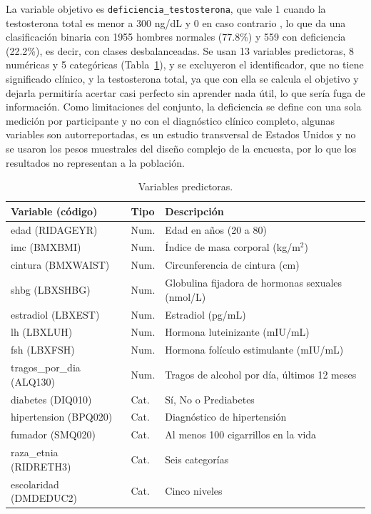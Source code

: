 \documentclass[conference]{IEEEtran}
\begin{document}
La variable objetivo es \texttt{deficiencia\_testosterona}, que vale 1 cuando la testosterona total es menor a 300 ng/dL y 0 en caso contrario \cite{mulhall2018}, lo que da una clasificación binaria con 1955 hombres normales (77.8\%) y 559 con deficiencia (22.2\%), es decir, con clases desbalanceadas. Se usan 13 variables predictoras, 8 numéricas y 5 categóricas (Tabla~\ref{tab:variables}), y se excluyeron el identificador, que no tiene significado clínico, y la testosterona total, ya que con ella se calcula el objetivo y dejarla permitiría acertar casi perfecto sin aprender nada útil, lo que sería fuga de información. Como limitaciones del conjunto, la deficiencia se define con una sola medición por participante y no con el diagnóstico clínico completo, algunas variables son autorreportadas, es un estudio transversal de Estados Unidos y no se usaron los pesos muestrales del diseño complejo de la encuesta, por lo que los resultados no representan a la población.

\begin{table}[t]
\centering
\footnotesize
\caption{Variables predictoras.}
\label{tab:variables}
\begin{tabular}{l l p{4.6cm}}
\toprule
Variable (código) & Tipo & Descripción \\
\midrule
edad (RIDAGEYR) & Num. & Edad en años (20 a 80) \\
imc (BMXBMI) & Num. & Índice de masa corporal (kg/m$^2$) \\
cintura (BMXWAIST) & Num. & Circunferencia de cintura (cm) \\
shbg (LBXSHBG) & Num. & Globulina fijadora de hormonas sexuales (nmol/L) \\
estradiol (LBXEST) & Num. & Estradiol (pg/mL) \\
lh (LBXLUH) & Num. & Hormona luteinizante (mIU/mL) \\
fsh (LBXFSH) & Num. & Hormona folículo estimulante (mIU/mL) \\
tragos\_por\_dia (ALQ130) & Num. & Tragos de alcohol por día, últimos 12 meses \\
diabetes (DIQ010) & Cat. & Sí, No o Prediabetes \\
hipertension (BPQ020) & Cat. & Diagnóstico de hipertensión \\
fumador (SMQ020) & Cat. & Al menos 100 cigarrillos en la vida \\
raza\_etnia (RIDRETH3) & Cat. & Seis categorías \\
escolaridad (DMDEDUC2) & Cat. & Cinco niveles \\
\bottomrule
\end{tabular}
\end{table}
\end{document}

